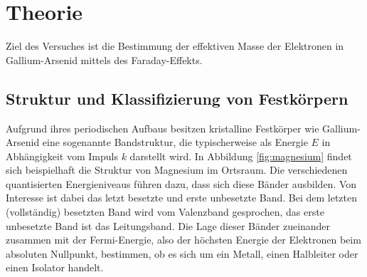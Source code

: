 \section{Theorie}
\label{sec:Theorie}

Ziel des Versuches ist die Bestimmung der effektiven Masse der Elektronen in Gallium-Arsenid mittels des Faraday-Effekts.

\subsection{Struktur und Klassifizierung von Festkörpern}
Aufgrund ihres periodischen Aufbaus besitzen kristalline Festkörper wie Gallium-Arsenid eine sogenannte Bandstruktur, die typischerweise als Energie $E$ in Abhängigkeit vom Impuls $k$ darstellt wird.
In Abbildung \ref{fig:magnesium}
findet sich beispielhaft die Struktur von Magnesium im Ortsraum. Die verschiedenen quantisierten Energieniveaus führen dazu, dass sich diese Bänder ausbilden. Von Interesse ist dabei das letzt besetzte und erste unbesetzte Band.
Bei dem letzten (vollständig) besetzten Band wird vom Valenzband gesprochen, das erste unbesetzte Band ist das Leitungsband. Die Lage dieser Bänder zueinander zusammen mit der Fermi-Energie, also der höchsten Energie der Elektronen
beim absoluten Nullpunkt, bestimmen, ob es sich um ein Metall, einen Halbleiter oder einen Isolator handelt.

